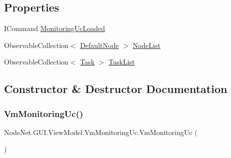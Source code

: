 \subsection*{Properties}
\begin{DoxyCompactItemize}
\item 
I\+Command \hyperlink{class_node_net_1_1_g_u_i_1_1_view_model_1_1_vm_monitoring_uc_af47860330ccdb9602faaad06aeacc3ae}{Monitoring\+Uc\+Loaded}
\item 
Observable\+Collection$<$ \hyperlink{class_node_net_1_1_network_1_1_nodes_1_1_default_node}{Default\+Node} $>$ \hyperlink{class_node_net_1_1_g_u_i_1_1_view_model_1_1_vm_monitoring_uc_a7bc37374a2de1a25c954ffcafaea4866}{Node\+List}
\item 
Observable\+Collection$<$ \hyperlink{class_node_net_1_1_tasks_1_1_task}{Task} $>$ \hyperlink{class_node_net_1_1_g_u_i_1_1_view_model_1_1_vm_monitoring_uc_a5f4d83fbaefb0b70b26e4d87f3945407}{Task\+List}
\end{DoxyCompactItemize}


\subsection{Constructor \& Destructor Documentation}
\mbox{\label{class_node_net_1_1_g_u_i_1_1_view_model_1_1_vm_monitoring_uc_af7d7dfd28786e8cf72b26656503ae4c6}} 
\subsubsection{\texorpdfstring{Vm\+Monitoring\+Uc()}{VmMonitoringUc()}}
{\footnotesize\ttfamily Node\+Net.\+G\+U\+I.\+View\+Model.\+Vm\+Monitoring\+Uc.\+Vm\+Monitoring\+Uc (\begin{DoxyParamCaption}{ }\end{DoxyParamCaption})}



